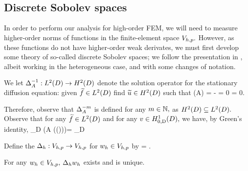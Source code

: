 \subsection{Discrete Sobolev spaces}\label{sec:discsob}
In order to perform our analysis for high-order FEM, we will need to measure higher-order norms of functions in the finite-element space $V_{h,p}.$ However, as these functions do not have higher-order weak derivates, we must first develop some theory of so-called discrete Sobolev spaces; we follow the presentation in \cite{DuWu:15}, albeit working in the heterogeneous case, and with some changes of notation.

We let $\DeltaAI:\LtD\rightarrow\HtD$ denote the solution operator for the stationary diffusion equation: given $\ftilde \in \LtD$ find $\utilde \in \HtD$ such that
\beqs
\grad \cdot \mleft(A\grad \utilde\mright) = -\ftilde
\eeqs
\beqs
\trD \utilde = 0
\eeqs
\beqs
\dn \utilde = 0.
\eeqs
{}


Therefore, observe that $\Delta_{A}^{-m}$ is defined for any $m \in \mathbb N,$ as $\HtD \subseteq \LtD.$
Observe that for any $\ftilde \in \LtD$ and for any $v \in \HozDD,$ we have, by Green's identity,
\beq\label{eq:deltaagreen}
\int_D \mleft(A \grad \mleft(\DeltaAI(\ftilde)\mright)\mright)\cdot \grad \vb = \int_D \ftilde \vb
\eeq

Define the  $\Delta_{h}:V_{h,p}\rightarrow V_{h,p}$ for $w_{h} \in V_{h,p}$ by
\beq\label{eq:discderdef}
\IPLtD{\Deltah \wh}{\vh} =  \tforall \vh \in \Vhp.
\eeq
\ede

\label{lem:ddwd}
For any $w_{h} \in V_{h,p},$ $\Delta_{h} w_{h}$ exists and is unique.
\ele

